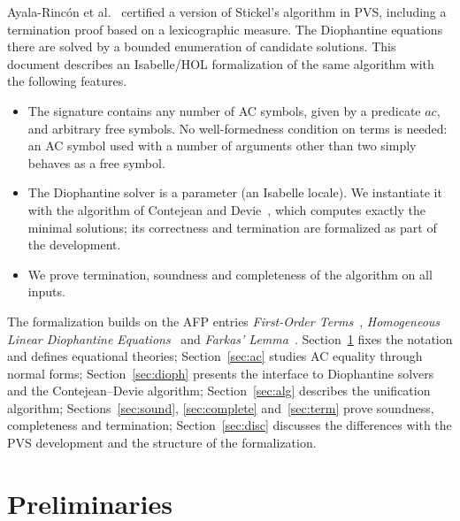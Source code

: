 \documentclass[11pt,a4paper]{article}
\theoremstyle{definition}
\theoremstyle{remark}
\begin{document}
Ayala-Rinc\'on et al.~\cite{AyalaRincon22,AyalaRincon24} certified a version of Stickel's algorithm
in PVS, including a termination proof based on a lexicographic measure. The Diophantine equations
there are solved by a bounded enumeration of candidate solutions. This document describes an
Isabelle/HOL formalization of the same algorithm with the following features.

\begin{itemize}[leftmargin=*]
  \item The signature contains any number of AC symbols, given by a predicate $\mathit{ac}$, and
        arbitrary free symbols. No well-formedness condition on terms is needed: an AC symbol used
        with a number of arguments other than two simply behaves as a free symbol.
  \item The Diophantine solver is a parameter (an Isabelle locale). We instantiate it with the
        algorithm of Contejean and Devie~\cite{BCD90,CD94}, which computes exactly the minimal
        solutions; its correctness and termination are formalized as part of the development.
  \item We prove termination, soundness and completeness of the algorithm on all inputs.
\end{itemize}

The formalization builds on the AFP entries \emph{First-Order Terms}~\cite{AFP-FOT},
\emph{Homogeneous Linear Diophantine Equations}~\cite{AFP-HLDE} and \emph{Farkas' Lemma}~\cite{AFP-Farkas}.
Section~\ref{sec:prelim} fixes the notation and defines equational theories;
Section~\ref{sec:ac} studies AC equality through normal forms;
Section~\ref{sec:dioph} presents the interface to Diophantine solvers and the Contejean--Devie
algorithm; Section~\ref{sec:alg} describes the unification algorithm;
Sections~\ref{sec:sound}, \ref{sec:complete} and~\ref{sec:term} prove soundness, completeness and
termination; Section~\ref{sec:disc} discusses the differences with the PVS development and the
structure of the formalization.

\section{Preliminaries}\label{sec:prelim}
\end{document}
